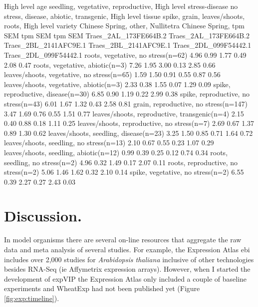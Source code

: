 \begin{landscape}
\begin{code_2}[label=lst:exp:exportSample, caption={[Export data example] Export data example, corresponding to the data plot in Figure \ref{fig:exp:tutorial1}}]
High level age	seedling, vegetative, reproductive, 
High level stress-disease	no stress, disease, abiotic, transgenic, 
High level tissue	spike, grain, leaves/shoots, roots, 
High level variety	Chinese Spring, other, Nullitetra Chinese Spring, 
	tpm	SEM	tpm	SEM	tpm	SEM	
	Traes_2AL_173FE664B.2	Traes_2AL_173FE664B.2	Traes_2BL_2141AFC9E.1	Traes_2BL_2141AFC9E.1	Traes_2DL_099F54442.1	Traes_2DL_099F54442.1	
roots, vegetative, no stress(n=62)	4.96	0.99	1.77	0.49	2.08	0.47
roots, vegetative, abiotic(n=3)	7.26	1.95	3.00	0.13	2.85	0.66
leaves/shoots, vegetative, no stress(n=65)	1.59	1.50	0.91	0.55	0.87	0.56
leaves/shoots, vegetative, abiotic(n=3)	2.33	0.38	1.55	0.07	1.29	0.09
spike, reproductive, disease(n=30)	6.85	0.90	1.19	0.22	2.99	0.38
spike, reproductive, no stress(n=43)	6.01	1.67	1.32	0.43	2.58	0.81
grain, reproductive, no stress(n=147)	3.47	1.69	0.76	0.55	1.51	0.77
leaves/shoots, reproductive, transgenic(n=4)	2.15	0.40	0.88	0.18	1.11	0.25
leaves/shoots, reproductive, no stress(n=7)	2.69	0.67	1.37	0.89	1.30	0.62
leaves/shoots, seedling, disease(n=23)	3.25	1.50	0.85	0.71	1.64	0.72
leaves/shoots, seedling, no stress(n=13)	2.10	0.67	0.55	0.23	1.07	0.29
leaves/shoots, seedling, abiotic(n=12)	0.99	0.39	0.25	0.12	0.74	0.34
roots, seedling, no stress(n=2)	4.96	0.32	1.49	0.17	2.07	0.11
roots, reproductive, no stress(n=2)	5.06	1.46	1.62	0.32	2.10	0.14
spike, vegetative, no stress(n=2)	6.55	0.39	2.27	0.27	2.43	0.03
\end{code_2}
\end{landscape}

\section{Discussion.} 



In model organisms there are several on-line resources that aggregate the raw data and meta analysis of several studies. 
For example, the Expression Atlas \acrshort{ebi}  includes over 2,000 studies for \textit{Arabidopsis thaliana} inclusive of other technologies besides RNA-Seq (ie Affymetrix expression arrays). 
However, when I started the development of expVIP the Expression Atlas only included a couple of baseline experiments and WheatExp had not been published yet (Figure \ref{fig:exp:timeline}).  

